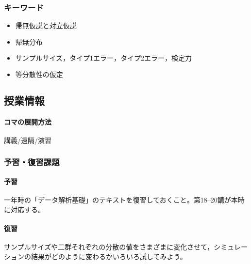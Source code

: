 \subsubsection{キーワード}
\begin{itemize}
	\item 帰無仮説と対立仮説
	\item 帰無分布
	\item サンプルサイズ，タイプ1エラー，タイプ2エラー，検定力
	\item 等分散性の仮定
\end{itemize}
\subsection{授業情報}
\paragraph{コマの展開方法}
講義/遠隔/演習
\subsubsection{予習・復習課題}
\paragraph{予習} 一年時の「データ解析基礎」のテキストを復習しておくこと。第18--20講が本時に対応する。
\paragraph{復習} サンプルサイズや二群それぞれの分散の値をさまざまに変化させて，シミュレーションの結果がどのように変わるかいろいろ試してみよう。